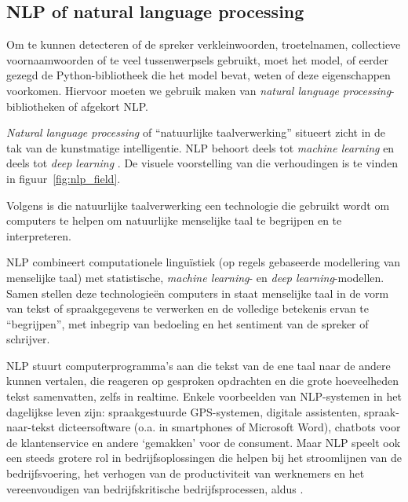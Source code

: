 \subsection{NLP of natural language processing}
Om te kunnen detecteren of de spreker verkleinwoorden, troetelnamen, collectieve voornaamwoorden of te veel tussenwerpsels gebruikt, moet het model, of eerder gezegd de Python-bibliotheek die het model bevat, weten of deze eigenschappen voorkomen. Hiervoor moeten we gebruik maken van \textit{natural language processing}-bibliotheken of afgekort NLP.

\textit{Natural language processing} of ``natuurlijke taalverwerking'' situeert zicht in de tak van de kunstmatige intelligentie. NLP behoort deels tot \textit{machine learning} en deels tot \textit{deep learning} \autocite{Kleinings2022}. De visuele voorstelling van die verhoudingen is te vinden in figuur~\ref{fig:nlp_field}.

Volgens \textcite{Kleinings2022} is die natuurlijke taalverwerking een technologie die gebruikt wordt om computers te helpen om natuurlijke menselijke taal te begrijpen en te interpreteren.

NLP combineert computationele linguïstiek (op regels gebaseerde modellering van menselijke taal) met statistische, \textit{machine learning}- en \textit{deep learning}-modellen. Samen stellen deze technologieën computers in staat menselijke taal in de vorm van tekst of spraakgegevens te verwerken en de volledige betekenis ervan te ``begrijpen'', met inbegrip van bedoeling en het sentiment van de spreker of schrijver.~\autocite{IBMCloudEducation2021}

NLP stuurt computerprogramma's aan die tekst van de ene taal naar de andere kunnen vertalen, die reageren op gesproken opdrachten en die grote hoeveelheden tekst samenvatten, zelfs in realtime. Enkele voorbeelden van NLP-systemen in het dagelijkse leven zijn: spraakgestuurde GPS-systemen, digitale assistenten, spraak-naar-tekst dicteersoftware (o.a. in smartphones of Microsoft Word), chatbots voor de klantenservice en andere `gemakken' voor de consument. Maar NLP speelt ook een steeds grotere rol in bedrijfsoplossingen die helpen bij het stroomlijnen van de bedrijfsvoering, het verhogen van de productiviteit van werknemers en het vereenvoudigen van bedrijfskritische bedrijfsprocessen, aldus \textcite{IBMCloudEducation2021}.

